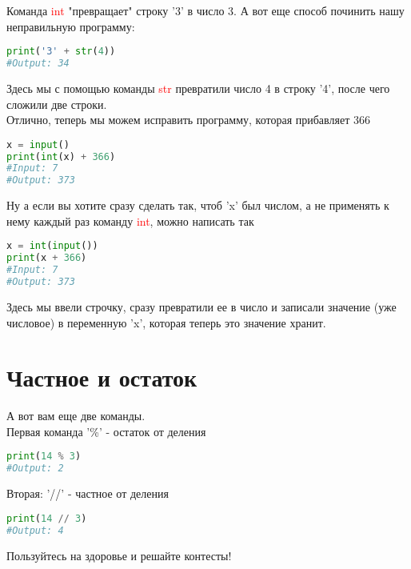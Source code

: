 \documentclass[12pt]{article} %
\begin{document}
Команда \textcolor{red}{int} "превращает" строку '3' в число 3. А вот еще способ починить нашу неправильную программу:
\begin{lstlisting}[language=Python]
print('3' + str(4))
#Output: 34
\end{lstlisting} 
Здесь мы с помощью команды \textcolor{red}{str} превратили число 4 в строку '4', после чего сложили две строки.\\
Отлично, теперь мы можем исправить программу, которая прибавляет 366
\begin{lstlisting}[language=Python]
x = input()
print(int(x) + 366)
#Input: 7
#Output: 373
\end{lstlisting}
Ну а если вы хотите сразу сделать так, чтоб 'x' был числом, а не применять к нему каждый раз команду \textcolor{red}{int}, можно написать так
\begin{lstlisting}[language=Python]
x = int(input())
print(x + 366)
#Input: 7
#Output: 373
\end{lstlisting}
Здесь мы ввели строчку, сразу превратили ее в число и записали значение (уже числовое) в переменную 'x', которая теперь это значение хранит. 

\section{Частное и остаток}
А вот вам еще две команды.\\
Первая команда '\%' - остаток от деления
\begin{lstlisting}[language=Python]
print(14 % 3)
#Output: 2
\end{lstlisting}
Вторая: '//' - частное от деления
\begin{lstlisting}[language=Python]
print(14 // 3)
#Output: 4
\end{lstlisting}
Пользуйтесь на здоровье и решайте контесты!
\end{document}
